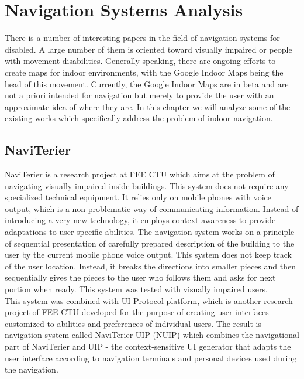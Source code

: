 \section{Navigation Systems Analysis}
\label{sec:nsa}
There is a number of interesting papers in the field of navigation systems for disabled. A large number of them is oriented toward visually impaired or people with movement disabilities. Generally speaking, there are ongoing efforts to create maps for indoor environments, with the Google Indoor Maps being the head of this movement. Currently, the Google Indoor Maps are in beta and are not a priori intended for navigation but merely to provide the user with an approximate idea of where they are. In this chapter we will analyze some of the existing works which specifically address the problem of indoor navigation.

\subsection{NaviTerier}
NaviTerier \cite{naviterier} is a research project at FEE CTU which aims at the problem of navigating visually impaired inside buildings. This system does not require any specialized technical equipment. It relies only on mobile phones with voice output, which is a non-problematic way of communicating information. Instead of introducing a very new technology, it employs context awareness to provide adaptations to user-specific abilities. The navigation system works on a principle of sequential presentation of carefully prepared description of the building to the user by the current mobile phone voice output. This system does not keep track of the user location. Instead, it breaks the directions into smaller pieces and then sequentially gives the pieces to the user who follows them and asks for next portion when ready. This system was tested with visually impaired users.\\
This system was combined with UI Protocol platform, which is another research project of FEE CTU developed for the purpose of creating user interfaces customized to abilities and preferences of individual users. The result is navigation system called NaviTerier UIP (NUIP) \cite{balata} which combines the navigational part of NaviTerier and UIP - the context-sensitive UI generator that adapts the user interface according to navigation terminals and personal devices used during the navigation.

